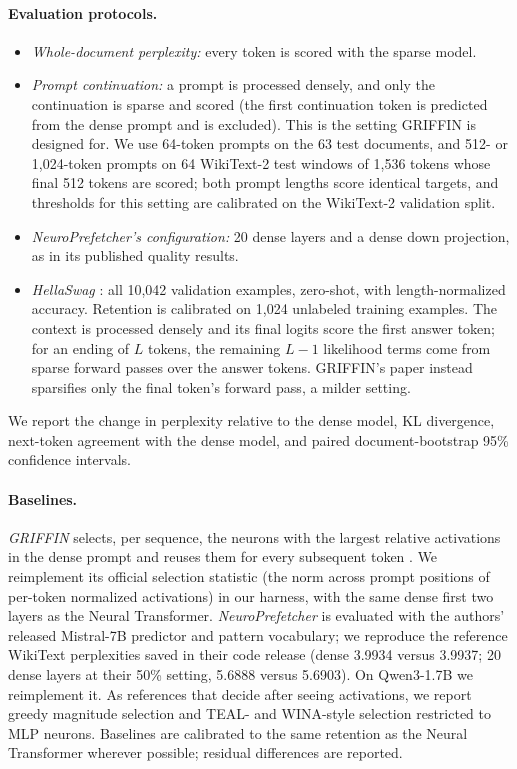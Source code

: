 \documentclass[10pt,twocolumn,letterpaper]{article}
\begin{document}
\paragraph{Evaluation protocols.}
\begin{itemize}
\item \emph{Whole-document perplexity:} every token is scored with the sparse model.
\item \emph{Prompt continuation:} a prompt is processed densely, and only the continuation is sparse and scored (the first continuation token is predicted from the dense prompt and is excluded). This is the setting GRIFFIN is designed for. We use 64-token prompts on the 63 test documents, and 512- or 1,024-token prompts on 64 WikiText-2 test windows of 1,536 tokens whose final 512 tokens are scored; both prompt lengths score identical targets, and thresholds for this setting are calibrated on the WikiText-2 validation split.
\item \emph{NeuroPrefetcher's configuration:} 20 dense layers and a dense down projection, as in its published quality results.
\item \emph{HellaSwag} \citep{zellers2019hellaswag}: all 10,042 validation examples, zero-shot, with length-normalized accuracy. Retention is calibrated on 1,024 unlabeled training examples. The context is processed densely and its final logits score the first answer token; for an ending of $L$ tokens, the remaining $L-1$ likelihood terms come from sparse forward passes over the answer tokens. GRIFFIN's paper instead sparsifies only the final token's forward pass, a milder setting.
\end{itemize}
We report the change in perplexity relative to the dense model, KL divergence, next-token agreement with the dense model, and paired document-bootstrap 95\% confidence intervals.

\paragraph{Baselines.} \emph{GRIFFIN} selects, per sequence, the neurons with the largest relative activations in the dense prompt and reuses them for every subsequent token \citep{dong2024griffin}. We reimplement its official selection statistic (the norm across prompt positions of per-token normalized activations) in our harness, with the same dense first two layers as the Neural Transformer. \emph{NeuroPrefetcher} \citep{dhar2026neuroprefetcher} is evaluated with the authors' released Mistral-7B predictor and pattern vocabulary; we reproduce the reference WikiText perplexities saved in their code release (dense 3.9934 versus 3.9937; 20 dense layers at their 50\% setting, 5.6888 versus 5.6903). On Qwen3-1.7B we reimplement it. As references that decide after seeing activations, we report greedy magnitude selection and TEAL- and WINA-style selection restricted to MLP neurons. Baselines are calibrated to the same retention as the Neural Transformer wherever possible; residual differences are reported.
\end{document}
